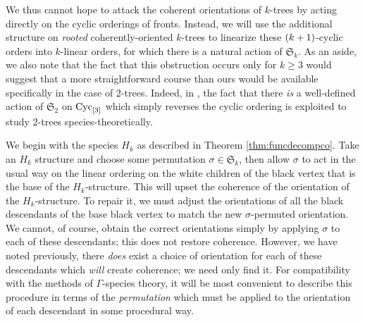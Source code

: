 \documentclass[sectionflow,singlespace,twoside,boldmathhdr]{brandiss} %
\numberwithin{section}{chapter}
\numberwithin{figure}{chapter}
\begin{document}
We thus cannot hope to attack the coherent orientations of $k$-trees by acting directly on the cyclic orderings of fronts.
Instead, we will use the additional structure on \emph{rooted} coherently-oriented $k$-trees to linearize these $\left( {k+1} \right)$-cyclic orders into $k$-linear orders, for which there is a natural action of $\mathfrak{S}_{k}$.
As an aside, we also note that the fact that this obstruction occurs only for $k \geq 3$ would suggest that a more straightforward course than ours would be available specifically in the case of $2$-trees.
Indeed, in \cite{gessel:spec2trees}, the fact that there \emph{is} a well-defined action of $\mathfrak{S}_{2}$ on $\operatorname{Cyc}_{\left[ {3} \right]}$ which simply reverses the cyclic ordering is exploited to study $2$-trees species-theoretically.

We begin with the species $H_{k}$ as described in Theorem \ref{thm:funcdecompco}.
Take an $H_{k}$ structure and choose some permutation $\sigma \in \mathfrak{S}_{k}$, then allow $\sigma$ to act in the usual way on the linear ordering on the white children of the black vertex that is the base of the $H_{k}$-structure.
This will upset the coherence of the orientation of the $H_{k}$-structure.
To repair it, we must adjust the orientations of all the black descendants of the base black vertex to match the new $\sigma$-permuted orientation.
We cannot, of course, obtain the correct orientations simply by applying $\sigma$ to each of these descendants; this does not restore coherence.
However, we have noted previously, there \emph{does} exist a choice of orientation for each of these descendants which \emph{will} create coherence; we need only find it.
For compatibility with the methods of $\Gamma$-species theory, it will be most convenient to describe this procedure in terms of the \emph{permutation} which must be applied to the orientation of each descendant in some procedural way.
\end{document}
